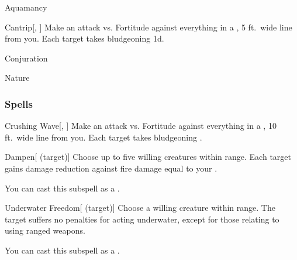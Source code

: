 \newpage
\begin{spellsection}{Aquamancy}

\begin{spellheader}
\end{spellheader}


\begin{ability}{Cantrip}[, ]
Make an attack vs. Fortitude against everything in a \areamed, 5 ft.\ wide line from you.
\hit Each target takes bludgeoning  \minus1d.
\end{ability}




 Conjuration

 Nature
\end{spellsection}


\subsubsection{Spells}


\begin{ability}[\nth{1}]{Crushing Wave}[, ]
Make an attack vs. Fortitude against everything in a \arealarge, 10 ft.\ wide line from you.
\hit Each target takes bludgeoning .
\end{ability}
\vspace{0.25em}



\begin{ability}[\nth{1}]{Dampen}[ (target)]
Choose up to five willing creatures within \rngclose range.
Each target gains damage reduction against fire damage equal to your .

You can cast this subspell as a .
\end{ability}
\vspace{0.25em}



\begin{ability}[\nth{1}]{Underwater Freedom}[ (target)]
Choose a willing creature within \rngclose range.
The target suffers no penalties for acting underwater, except for those relating to using ranged weapons.

You can cast this subspell as a .
\end{ability}
\vspace{0.25em}




